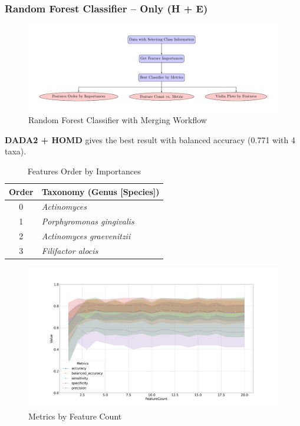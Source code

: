 \documentclass{beamer}
\begin{document}
    \begin{frame}[allowframebreaks]
        \frametitle{Random Forest Classifier -- Only (H + E)}

        \begin{figure}
            \includegraphics[width=0.8 \linewidth]{figures/RandomForest/select.pdf}
            \caption{Random Forest Classifier with Merging Workflow}
        \end{figure}

        \textbf{DADA2 + HOMD} gives the best result with balanced accuracy (0.771 with 4 taxa).

        \begin{table}
            \caption{Features Order by Importances}
            \begin{tabular}{c|l}
                Order & Taxonomy (Genus [Species]) \\ \hline
                0 & \textit{Actinomyces} \\
                1 & \textit{Porphyromonas gingivalis} \\
                2 & \textit{Actinomyces graevenitzii} \\
                3 & \textit{Filifactor alocis} \\
            \end{tabular}
        \end{table}

        \begin{figure}
            \includegraphics[width=0.8 \linewidth]{figures/RandomForest/HE.DADA2.homd/metrics.png}
            \caption{Metrics by Feature Count}
        \end{figure}


\end{frame}
\end{document}
